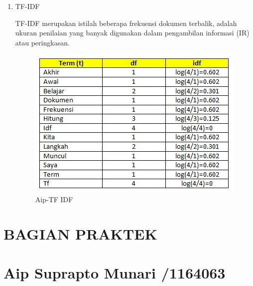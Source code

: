 \begin{enumerate}
\item TF-IDF
	\par TF-IDF merupakan istilah beberapa frekuensi dokumen terbalik, adalah ukuran penilaian yang banyak digunakan dalam pengambilan informasi (IR) atau peringkasan. 
	\begin{figure}[!hbtp]
		\centering
		\includegraphics[scale=0.5]{figures/AIP/b5.PNG}
		\caption{Aip-TF IDF}
		\label{contoh}
	\end{figure}
\end{enumerate}

\section{BAGIAN PRAKTEK}
\section{Aip Suprapto Munari /1164063}

